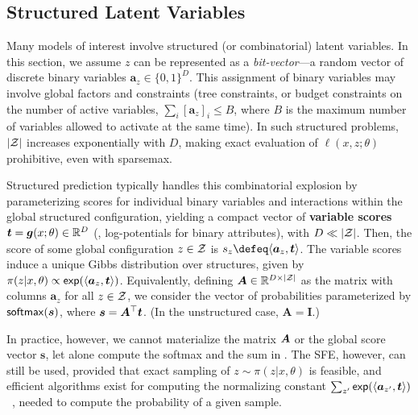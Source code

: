 \subsection{Structured Latent Variables}\label{sec:struct_lvm_bg}

\noindent Many models of interest involve structured (or combinatorial) latent
variables. In this section, we assume $z$ can be represented as a
        {\it bit-vector}---\ie a random vector of discrete binary variables
$\bm{a}_{z} \in \{0, 1\}^D$. This assignment of binary variables may
involve global factors and constraints (\eg tree constraints, or
budget constraints on the number of active variables, \ie $\sum_i
        [\bm{a}_{z}]_i \le B$, where $B$ is the maximum number of variables
allowed to activate at the same time). In such structured problems,
$|\ZZ|$ increases exponentially with $D$, making exact evaluation of
$\ell(x, z; \theta)$ prohibitive, even with sparsemax.

Structured prediction typically handles this combinatorial explosion
by parameterizing scores for individual binary variables and
interactions within the global structured configuration, yielding a
compact vector of \textbf{variable scores} $\bm{t} = \g(x; \theta)
        \in \mathbb{R}^D$ (\eg, log-potentials for binary attributes), with
$D \ll |\ZZ|$. Then, the score of some global configuration $z \in
        \ZZ$ is $s_z \defeq \DP{\bm{a}_z}{\bm{t}}$. The variable scores
induce a unique Gibbs distribution over structures, given by
$\pi(z|x,\theta) \propto \exp(\DP{\bm{a}_{z}}{\bm{t}})$.
Equivalently, defining $\bm{A} \in \mathbb{R}^{D \times |\ZZ|}$ as
the matrix with columns $\bm{a}_{z}$ for all $z \in \ZZ$, we consider
the vector of probabilities parameterized by $\softmax(\s)$, where
$\s=\bm{A}^\top \bm{t}$. (In the unstructured case, $\bm{A}=\bm{I}$.)

In practice, however, we cannot materialize the matrix $\AA$ or the
global score vector $\bm{s}$, let alone compute the softmax and the
sum in . The SFE, however, can still be used, provided
that exact sampling of $z\sim\pi(z | x, \theta)$ is feasible, and
efficient algorithms exist for computing the normalizing constant
$\sum_{z'}\exp(\DP{\bm{a}_{z'}}{\bm{t}})$~\citep{WJ2008}, needed to
compute the probability of a given sample.
